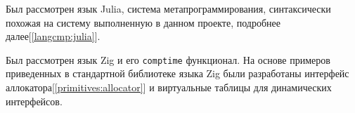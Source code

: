 Был рассмотрен язык Julia, система метапрограммирования\cite{julia-meta}, 
синтаксически похожая на систему выполненную в данном проекте, подробнее далее[\ref{langcmp:julia}]. 

Был рассмотрен язык Zig и его \verb|comptime| функционал\cite{zig-comptime}.
На основе примеров приведенных в стандартной библиотеке языка Zig были разработаны интерфейс аллокатора[\ref{primitives:allocator}] и виртуальные таблицы для динамических интерфейсов.


















